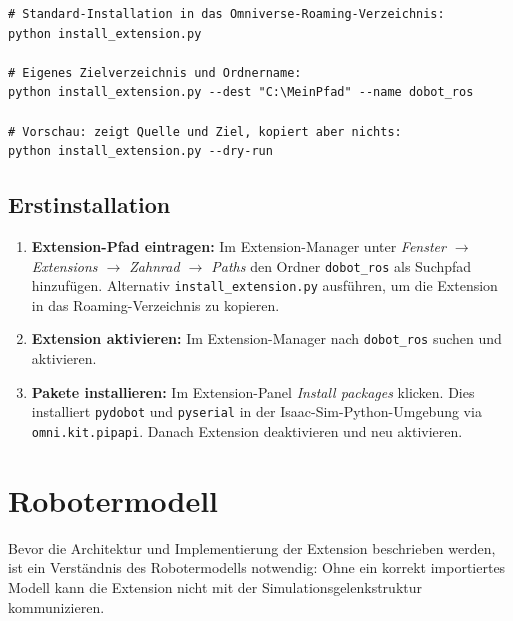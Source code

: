 \documentclass[11pt,a4paper]{article}
\begin{document}
\begin{lstlisting}[style=batch, caption={install\_extension.py -- Verwendung}]
# Standard-Installation in das Omniverse-Roaming-Verzeichnis:
python install_extension.py

# Eigenes Zielverzeichnis und Ordnername:
python install_extension.py --dest "C:\MeinPfad" --name dobot_ros

# Vorschau: zeigt Quelle und Ziel, kopiert aber nichts:
python install_extension.py --dry-run
\end{lstlisting}

\subsection{Erstinstallation}

\begin{enumerate}
  \item \textbf{Extension-Pfad eintragen:}
        Im Extension-Manager unter
        \textit{Fenster $\to$ Extensions $\to$ Zahnrad $\to$ Paths}
        den Ordner \texttt{dobot\_ros} als Suchpfad hinzufügen.
        Alternativ \texttt{install\_extension.py} ausführen, um
        die Extension in das Roaming-Verzeichnis zu kopieren.

  \item \textbf{Extension aktivieren:}
        Im Extension-Manager nach \texttt{dobot\_ros} suchen
        und aktivieren.

  \item \textbf{Pakete installieren:}
        Im Extension-Panel \textit{Install packages} klicken.
        Dies installiert \texttt{pydobot} und \texttt{pyserial}
        in der Isaac-Sim-Python-Umgebung via
        \texttt{omni.kit.pipapi}.
        Danach Extension deaktivieren und neu aktivieren.
\end{enumerate}

\section{Robotermodell}
\label{sec:robotermodell}

Bevor die Architektur und Implementierung der Extension beschrieben
werden, ist ein Verständnis des Robotermodells notwendig: Ohne ein
korrekt importiertes Modell kann die Extension nicht mit der
Simulationsgelenkstruktur kommunizieren.
\end{document}
